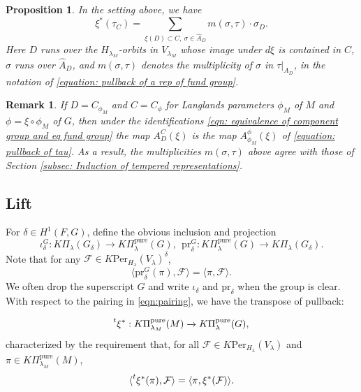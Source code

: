 \documentclass[11pt,letterpaper]{amsart}
\newcommand{\irrepdual}[1]{\widehat{#1}}
\newcommand{\pure}{\mathrm{pure}}
\newcommand{\pr}{\mathrm{pr}}
\newcommand{\Per}{\mathrm{Per}}
\newcommand{\stsh}[2]{{#1}_{#2}}
\newtheorem{prop}[thm]{Proposition}
\newtheorem{remark}[thm]{Remark}
\renewcommand{\1}{\mathbbm{1}}
\numberwithin{equation}{section}
\begin{document}
{\begin{prop}\label{prop: equivariant restriction}
   In the setting above, we have
    \begin{equation}\label{eqn: restriction formula on standards}
    \xi^*(\stsh{\tau}{C}) = \sum_{\xi(D)\subset C,~\sigma \in \irrepdual{A}_D} m(\sigma,\tau) \cdot \stsh{\sigma}{D}.
\end{equation}
Here $D$ runs over the $H_{\lambda_M}$-orbits in $V_{\lambda_M}$ whose image under $d\xi$ is contained in $C$, $\sigma$ runs over $\irrepdual{A}_D$, and $m(\sigma,\tau)$ denotes the multiplicity of $\sigma$ in $\tau\vert_{A_D}$, in the notation of \eqref{equation: pullback of a rep of fund group}.
\end{prop}


\begin{remark}
   If $D=C_{\phi_M}$ and $C=C_\phi$ for Langlands parameters $\phi_M$ of $M$ and $\phi=\xi\circ\phi_M$ of $G$, then under the identifications \eqref{eqn: equivalence of component group and eq fund group} the map $A_D^C(\xi)$ is the map $A_{\phi_M}^\phi(\xi)$ of \eqref{equation: pullback of tau}. As a result, the multiplicities $m(\sigma,\tau)$ above agree with those of Section \ref{subsec: Induction of tempered representations}. 
\end{remark} 
\subsection{Lift}\label{subsection: lift}
For $\delta\in H^1(F,G)$, define the obvious inclusion and projection
\begin{equation}\label{equation: inclusion of grothendieck groups of reps}
    \iota_\delta^G: K\Pi_{\lambda}(G_\delta) \to K\Pi_\lambda^\pure(G), \ \ \pr_\delta^G:K\Pi_\lambda^\pure(G) \to K\Pi_{\lambda}(G_\delta). 
\end{equation}
Note that for any $\mathcal{F}\in K\Per_{H_\lambda}(V_\lambda)^\delta$,
\begin{equation}\label{equation: transpose of projection}
\langle \pr^G_\delta(\pi), \mathcal{F}\rangle = \langle \pi, \mathcal{F}\rangle.
\end{equation}
We often drop the superscript $G$ and write $\iota_\delta$ and $\pr_\delta$ when the group is clear.
With respect to the pairing in \eqref{eqn:pairing}, we have the transpose of pullback: 

\[\prescript{t}{}{\xi^*}: K\Pi_{\lambda_M}^\pure(M) \xrightarrow{} K\Pi^\pure_\lambda(G),\] characterized by the requirement that, for all $\mathcal{F} \in K\Per_{H_{\lambda}}(V_{\lambda})$ and $\pi \in K\Pi_{\lambda_M}^\pure(M) $, 
\begin{equation}\label{equation: transpose of restriction}
    \langle \prescript{t}{}{\xi^*}(\pi), \mathcal{F} \rangle = \langle \pi, \xi^*(\mathcal{F})\rangle.
\end{equation}

}
\end{document}
